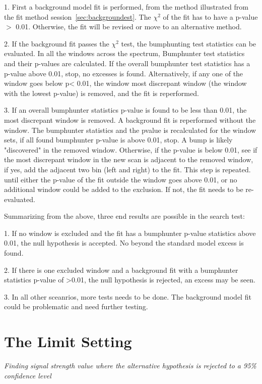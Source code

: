     1.  First a background model fit is performed, from the method illustrated from the fit method session~\ref{sec:backgroundest}. The $\chi^{2}$ of the fit has to have a p-value $>$ 0.01. Otherwise, the fit will be revised or move to an alternative method.

    2.  If the background fit passes the $\chi^{2}$ test, the bumphunting test statistics can be evaluated. In all the windows across the spectrum, Bumphunter test statistics and their p-values are calculated. If the overall bumphunter test statistics has a p-value above 0.01, stop, no excesses is found. Alternatively, if any one of the window goes below p< 0.01, the window most discrepant window (the window with the lowest p-value) is removed, and the fit is reperformed.

    3. If an overall bumphunter statistics p-value is found to be less than 0.01, the most discrepant window is removed. A background fit is reperformed without the window. The bumphunter statistics and the pvalue is recalculated for the window sets, if all found bumphunter p-value is above 0.01, stop. A bump is likely "discovered" in the removed window. Otherwise, if the p-value is below 0.01, see if the most discrepant window in the new scan is adjacent to the removed window, if yes, add the adjacent two bin (left and right) to the fit. This step is repeated. until either the p-value of the fit outside the window goes above 0.01, or no additional window could be added to the exclusion. If not, the fit needs to be re-evaluated.

    Summarizing from the above, three end results are possible in the search test:

    1. If no window is excluded and the fit has a bumphunter p-value statistics above 0.01, the null hypothesis is accepted. No beyond the standard model excess is found. 

    2. If there is one excluded window and a background fit with a bumphunter statistics p-value of >0.01, the null hypothesis is rejected, an excess may be seen. 

    3. In all other sceanrios, more tests needs to be done. The background model fit could be problematic and need further testing.  

\section{The Limit Setting}
\label{sec:limits}

\textit{Finding signal strength value where the alternative hypothesis is rejected to a 95\% confidence level}

